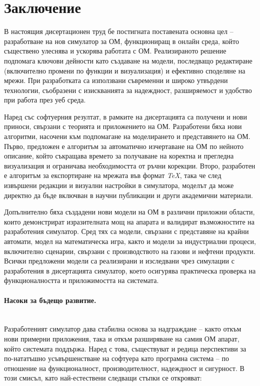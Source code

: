 \clearpage
{}
{}

\section*{Заключение}

\hspace*{2.5em}В настоящия дисертационен труд бе постигната поставената основна цел – разработване на нов симулатор за ОМ, функциониращ в онлайн среда, който съществено улеснява и ускорява работата с ОМ. Реализираното решение подпомага ключови дейности като създаване на модели, последващо редактиране (включително промени по функции и визуализация) и ефективно споделяне на мрежи. При разработката са използвани съвременни и широко утвърдени технологии, съобразени с изискванията за надеждност, разширяемост и удобство при работа през уеб среда.

Наред със софтуерния резултат, в рамките на дисертацията са получени и нови приноси, свързани с теорията и приложението на ОМ. Разработени бяха нови алгоритми, насочени към подпомагане на моделирането и представянето на ОМ. Първо, предложен е алгоритъм за автоматично изчертаване на ОМ по нейното описание, който съкращава времето за получаване на коректна и прегледна визуализация и ограничава необходимостта от ръчни корекции. Второ, разработен е алгоритъм за експортиране на мрежата във формат \textit{TeX}, така че след извършени редакции и визуални настройки в симулатора, моделът да може директно да бъде включван в научни публикации и други академични материали.

Допълнително бяха създадени нови модели на ОМ в различни приложни области, които демонстрират изразителната мощ на апарата и валидират възможностите на разработения симулатор. Сред тях са модели, свързани с представяне на крайни автомати, модел на математическа игра, както и модели за индустриални процеси, включително сценарии, свързани с производството на газови и нефтени продукти. Всички предложени модели са реализирани и изследвани чрез симулации с разработения в дисертацията симулатор, което осигурява практическа проверка на функционалността и приложимостта на системата.

\paragraph{Насоки за бъдещо развитие.}
\mbox{}\\
Разработеният симулатор дава стабилна основа за надграждане – както откъм нови примерни приложения, така и откъм разширяване на самия ОМ апарат, който системата поддържа. Наред с това, съществуват и редица перспективи за по-нататъшно усъвършенстване на софтуера като програмна система – по отношение на функционалност, производителност, надеждност и сигурност. В този смисъл, като най-естествени следващи стъпки се открояват:

